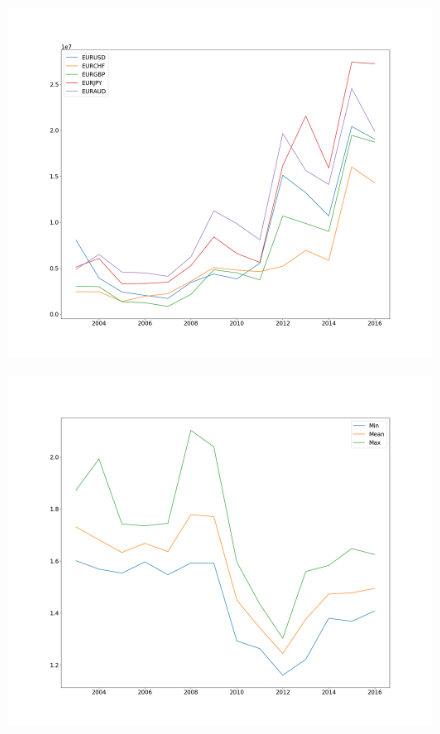 \documentclass[a4paper]{article}
\begin{document}
\begin{figure}
	\centering
	\begin{minipage}{.5\textwidth}
		\centering
		\includegraphics[width=\linewidth]{Figures/counts}
		\label{fig:1}
	\end{minipage}%
	\begin{minipage}{.5\textwidth}
		\centering
		\includegraphics[width=\linewidth]{Figures/stats_aud}
		\label{fig:2}
	\end{minipage}

\end{figure}
\end{document}
